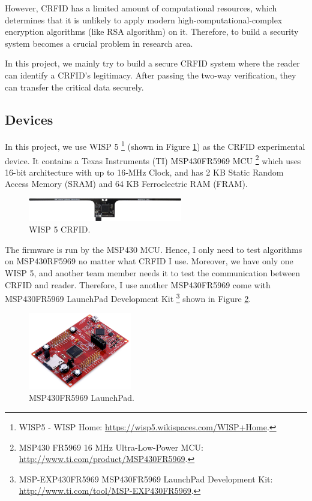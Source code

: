 \documentclass[sigconf, review=false]{acmart}
\let\OldTexttrademark\texttrademark
\renewcommand{\texttrademark}{\OldTexttrademark\xspace}%
\begin{document}
However, CRFID has a limited amount of computational resources, which determines that it is unlikely to apply
modern high-computational-complex encryption algorithms (like RSA algorithm) on it.
Therefore, to build a security system becomes a crucial problem in research area.

In this project, we mainly try to build a secure CRFID system
where the reader can identify a CRFID's legitimacy.
After passing the two-way verification, they can transfer the critical data securely.

\subsection{Devices}
In this project, we use WISP 5 \footnote{WISP5 - WISP Home: \url{https://wisp5.wikispaces.com/WISP+Home}.} (shown in Figure \ref{fig-wisp5})
as the CRFID experimental device.
It contains a Texas Instruments (TI) MSP430FR5969 MCU \footnote{MSP430\texttrademark FR5969 16 MHz Ultra-Low-Power MCU: \url{http://www.ti.com/product/MSP430FR5969}.}
which uses 16-bit architecture with up to 16‑MHz Clock, and has 2 KB Static Random Access Memory (SRAM) and 64 KB Ferroelectric RAM (FRAM).

\begin{figure}
\centering
\includegraphics[width=0.6\textwidth]{wisp5.png}
\caption{WISP 5 CRFID.}
\label{fig-wisp5}
\end{figure}

The firmware is run by the MSP430 MCU. Hence, I only need to test algorithms on MSP430RF5969 no matter what CRFID I use.
Moreover, we have only one WISP 5, and another team member needs it to test the communication between CRFID and reader.
Therefore, I use another MSP430FR5969 come with MSP430FR5969 LaunchPad Development Kit
\footnote{MSP-EXP430FR5969 MSP430FR5969 LaunchPad Development Kit: \url{http://www.ti.com/tool/MSP-EXP430FR5969}.}
shown in Figure \ref{fig-launchpad}.

\begin{figure}
\centering
\includegraphics[width=0.4\textwidth]{launchpad.jpg}
\caption{MSP430FR5969 LaunchPad.}
\label{fig-launchpad}
\end{figure}
\end{document}
